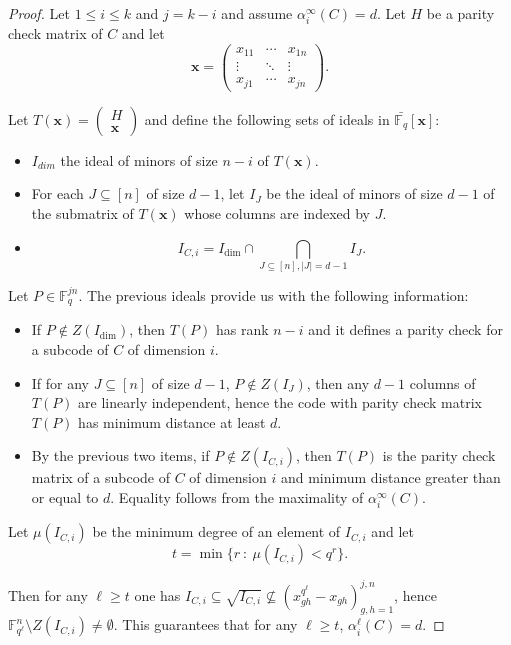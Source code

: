 \documentclass[10pt,a4paper]{amsart}
\begin{document}
\begin{proof}
Let $1\leq i\leq k$ and $j=k-i$ and assume $\alpha_i^\infty(C)=d$. Let $H$ be a parity check matrix of $C$ and let $$\mathbf{x}=\begin{pmatrix} x_{11}&\cdots&x_{1n}\\ \vdots&\ddots&\vdots\\
    x_{j1}&\cdots&x_{jn}\end{pmatrix}.$$

Let $T(\mathbf{x})=\begin{pmatrix} H\\ \mathbf{x}\end{pmatrix}$ and define the following sets of ideals in $\bar{\mathbb{F}_q}[\mathbf{x}]$:
\begin{itemize}
\item $I_{dim}$ the ideal of minors of size $n-i$ of $T(\mathbf{x})$.
\item For each $J\subseteq [n]$ of size $d-1$, let $I_J$ be the ideal of minors of size $d-1$ of the submatrix of $T(\mathbf{x})$ whose columns are indexed by $J$.
\item $$I_{C,i}=I_{\dim}\cap\bigcap_{J\subseteq[n], |J|=d-1} I_J.$$
\end{itemize}

Let $P\in\mathbb{F}_q^{jn}$. The previous ideals provide us with the following information:
\begin{itemize}
\item If $P\notin Z(I_{\dim})$, then $T(P)$ has rank $n-i$ and it defines a parity check for a subcode of $C$ of dimension $i$.
\item If for any $J\subseteq [n]$ of size $d-1$, $P\notin Z(I_J)$, then any $d-1$ columns of $T(P)$ are linearly independent, hence the code with parity check matrix $T(P)$ has minimum distance at least $d$.
\item By the previous two items, if $P\notin Z(I_{C,i})$, then $T(P)$ is the parity check matrix of a subcode of $C$ of dimension $i$ and minimum distance greater than or equal to $d$. Equality follows from the maximality of $\alpha_i^\infty(C)$.
\end{itemize}

Let $\mu(I_{C,i})$ be the minimum degree of an element of $I_{C,i}$ and let $$t=\min\{r\ :\ \mu(I_{C,i})< q^r\}.$$

Then for any $\ell\geq t$ one has $I_{C,i}\subseteq\sqrt {I_{C,i}}\not\subseteq (x_{gh}^{q^\ell}-x_{gh})_{g,h=1}^{j,n}$, hence $\mathbb{F}_{q^\ell}^n\setminus Z(I_{C,i})\neq \emptyset$. This guarantees that for any $\ell\geq t$, $\alpha_i^\ell(C)=d$.
\end{proof}
\end{document}
